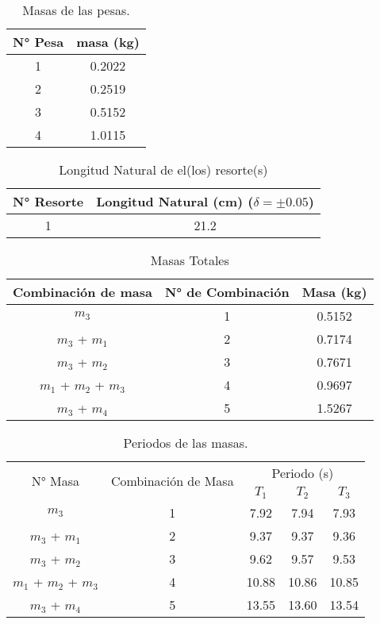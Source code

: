 \documentclass[../main.tex]{subfiles}
\begin{document}
\begin{table}[H]
    \centering
    \begin{tabular}{cc}
        \toprule
        N° Pesa & masa (\unit{\kilo\gram}) \\
        \midrule
        1 & \num{0.2022} \\
        2 & \num{0.2519} \\
        3 & \num{0.5152} \\
        4 & \num{1.0115} \\
        \bottomrule
    \end{tabular}
    \caption{Masas de las pesas.}
\end{table}
\begin{table}[H]
    \centering
    \begin{tabular}{cc}
        \toprule
        N° Resorte & Longitud Natural (\unit{\centi\metre}) ($\delta = \pm \num{0.05}$) \\
        \midrule
        1 & \num{21.2} \\
        \bottomrule
    \end{tabular}
    \caption{Longitud Natural de el(los) resorte(s)}
\end{table}
\begin{table}[H]
    \centering
    \begin{tabular}{ccc}
        \toprule
        Combinación de masa & N° de Combinación & Masa (\unit{\kilo\gram}) \\
        \midrule
        $m_3$                 & 1 & \num{0.5152} \\
        $m_3$ + $m_1$         & 2 & \num{0.7174} \\
        $m_3$ + $m_2$         & 3 & \num{0.7671} \\
        $m_1$ + $m_2$ + $m_3$ & 4 & \num{0.9697} \\
        $m_3$ + $m_4$         & 5 & \num{1.5267} \\
        \bottomrule
    \end{tabular}
    \caption{Masas Totales}
\end{table}
\begin{table}[H]
    \centering
    \begin{tabular}{ccccc}
        \toprule
        \multirow{2}{*}{N° Masa} &
        \multirow{2}{*}{Combinación de Masa} &
        \multicolumn{3}{c}{Periodo (\unit{\second})} \\
        \cmidrule{3-5}
         &  & $T_1$ & $T_2$ & $T_3$ \\
        \midrule
        $m_3$                 & \num{1} & \num{7.92}  & \num{7.94}  & \num{7.93} \\
        $m_3$ + $m_1$         & \num{2} & \num{9.37}  & \num{9.37}  & \num{9.36} \\
        $m_3$ + $m_2$         & \num{3} & \num{9.62}  & \num{9.57}  & \num{9.53} \\
        $m_1$ + $m_2$ + $m_3$ & \num{4} & \num{10.88} & \num{10.86} & \num{10.85} \\
        $m_3$ + $m_4$         & \num{5} & \num{13.55} & \num{13.60} & \num{13.54} \\
        \bottomrule
    \end{tabular}
    \caption{Periodos de las masas.}
\end{table}
\end{document}

